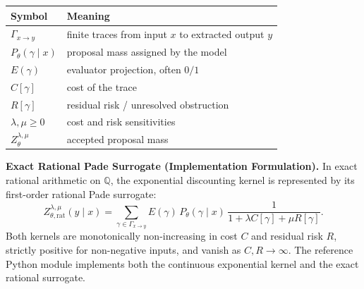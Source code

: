 \documentclass[
  10pt,
]{article}
\begin{document}
\begin{longtable}[]{@{}
  >{\raggedright\arraybackslash}p{}
  >{\raggedright\arraybackslash}p{}@{}}
\toprule\noalign{}
\begin{minipage}[b]{\linewidth}\raggedright
Symbol
\end{minipage} & \begin{minipage}[b]{\linewidth}\raggedright
Meaning
\end{minipage} \\
\midrule\noalign{}
\endhead
\bottomrule\noalign{}
\endlastfoot
\protect\hypertarget{math-E0032-0040}{}{\(\Gamma_{x\to y}\)} & finite traces from input \protect\hypertarget{math-E0019-0041}{}{\(x\)} to extracted output \protect\hypertarget{math-E0033-0042}{}{\(y\)} \\
\protect\hypertarget{math-E0034-0043}{}{\(P_\theta(\gamma\mid x)\)} & proposal mass assigned by the model \\
\protect\hypertarget{math-E0035-0044}{}{\(E(\gamma)\)} & evaluator projection, often \protect\hypertarget{math-E0036-0045}{}{\(0/1\)} \\
\protect\hypertarget{math-E0037-0046}{}{\(C[\gamma]\)} & cost of the trace \\
\protect\hypertarget{math-E0038-0047}{}{\(R[\gamma]\)} & residual risk / unresolved obstruction \\
\protect\hypertarget{math-E0039-0048}{}{\(\lambda,\mu\ge0\)} & cost and risk sensitivities \\
\protect\hypertarget{math-E0040-0049}{}{\(Z_\theta^{\lambda,\mu}\)} & accepted proposal mass \\
\end{longtable}

\textbf{Exact Rational Pade Surrogate (Implementation Formulation).} In exact rational arithmetic on \protect\hypertarget{math-E0041-0050}{}{\(\mathbb{Q}\)}, the exponential discounting kernel is represented by its first-order rational Pade surrogate: \protect\hypertarget{math-E0042-0051}{}{\[
Z_{\theta,\text{rat}}^{\lambda,\mu}(y\mid x) =
\sum_{\gamma\in\Gamma_{x\to y}}
E(\gamma)\,
P_\theta(\gamma\mid x)\,
\frac{1}{1 + \lambda C[\gamma] + \mu R[\gamma]}.
\]} Both kernels are monotonically non-increasing in cost \protect\hypertarget{math-E0043-0052}{}{\(C\)} and residual risk \protect\hypertarget{math-E0044-0053}{}{\(R\)}, strictly positive for non-negative inputs, and vanish as \protect\hypertarget{math-E0045-0054}{}{\(C, R \to \infty\)}. The reference Python module implements both the continuous exponential kernel and the exact rational surrogate.
\end{document}
